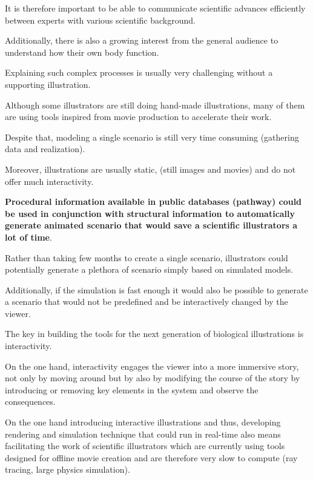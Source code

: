 It is therefore important to be able to communicate scientific advances efficiently between experts with various scientific background.

Additionally, there is also a growing interest from the general audience to understand how their own body function.

Explaining such complex processes is usually very challenging without a supporting illustration.

Although some illustrators are still doing hand-made illustrations, many of them are using tools inspired from movie production to accelerate their work.

Despite that, modeling a single scenario is still very time consuming (gathering data and realization).

Moreover, illustrations are usually static, (still images and movies) and do not offer much interactivity.



\textbf{Procedural information available in public databases (pathway) could be used in conjunction with structural information to automatically generate animated scenario that would save a scientific illustrators a lot of time}.

Rather than taking few months to create a single scenario, illustrators could potentially generate a plethora of scenario simply based on simulated models.

Additionally, if the simulation is fast enough it would also be possible to generate a scenario that would not be predefined and be interactively changed by the viewer.

The key in building the tools for the next generation of biological illustrations is interactivity.

On the one hand, interactivity engages the viewer into a more immersive story, not only by moving around but by also by modifying the course of the story by introducing or removing key elements in the system and observe the consequences.

On the one hand introducing interactive illustrations and thus, developing rendering and simulation technique that could run in real-time also means facilitating the work of scientific illustrators 
which are currently using tools designed for offline movie creation and are therefore very slow to compute (ray tracing, large physics simulation).











